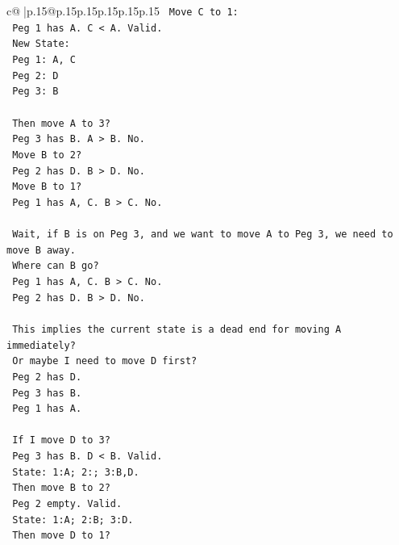 \documentclass{article}
\begin{document}
{\begin{supertabular}{c@{$\;$}|p{.15\linewidth}@{}p{.15\linewidth}p{.15\linewidth}p{.15\linewidth}p{.15\linewidth}p{.15\linewidth}}
{{{\texttt{            Move C to 1:} \\
\texttt{            Peg 1 has A. C < A. Valid.} \\
\texttt{            New State:} \\
\texttt{            Peg 1: A, C} \\
\texttt{            Peg 2: D} \\
\texttt{            Peg 3: B} \\
\\ 
\texttt{            Then move A to 3?} \\
\texttt{            Peg 3 has B. A > B. No.} \\
\texttt{            Move B to 2?} \\
\texttt{            Peg 2 has D. B > D. No.} \\
\texttt{            Move B to 1?} \\
\texttt{            Peg 1 has A, C. B > C. No.} \\
\\ 
\texttt{            Wait, if B is on Peg 3, and we want to move A to Peg 3, we need to move B away.} \\
\texttt{            Where can B go?} \\
\texttt{            Peg 1 has A, C. B > C. No.} \\
\texttt{            Peg 2 has D. B > D. No.} \\
\\ 
\texttt{            This implies the current state is a dead end for moving A immediately?} \\
\texttt{            Or maybe I need to move D first?} \\
\texttt{            Peg 2 has D.} \\
\texttt{            Peg 3 has B.} \\
\texttt{            Peg 1 has A.} \\
\\ 
\texttt{            If I move D to 3?} \\
\texttt{            Peg 3 has B. D < B. Valid.} \\
\texttt{            State: 1:A; 2:; 3:B,D.} \\
\texttt{            Then move B to 2?} \\
\texttt{            Peg 2 empty. Valid.} \\
\texttt{            State: 1:A; 2:B; 3:D.} \\
\texttt{            Then move D to 1?} \\
}}}
\end{supertabular}}
\end{document}
